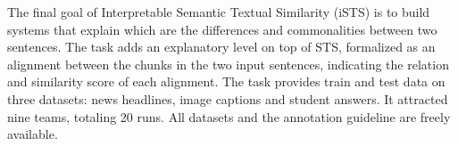 The final goal of Interpretable Semantic Textual Similarity (iSTS) is to build systems that explain which are the differences and commonalities between two sentences. The task adds an explanatory level on top of STS, formalized as an alignment between the chunks in the two input sentences, indicating the relation and similarity score of each alignment. The task provides train and test data on three datasets: news headlines, image captions and student answers. It attracted nine teams, totaling 20 runs. All datasets and the annotation guideline are freely available.
